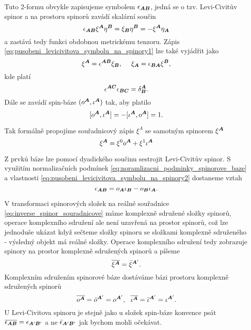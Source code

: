 Tuto 2-formu obvykle zapisujeme symbolem $\epsilon_{{\boldsymbol{A}} {\boldsymbol{B}}}$, jedná se o tzv. Levi-Civitův spinor a na prostoru
spinorů zavádí skalární součin
\begin{equation}
    \label{eq:pusobeni_levicivitova_symbolu_na_spinory1}
    \epsilon_{{\boldsymbol{A}} {\boldsymbol{B}}} \xi^{\boldsymbol{A}} \eta^{\boldsymbol{B}} = \xi_{\boldsymbol{B}} \eta^{\boldsymbol{B}} = -\xi^{\boldsymbol{A}}\eta_{\boldsymbol{A}}
\end{equation}
a zastává tedy funkci obdobnou metrickému tenzoru. Zápis \ref{eq:pusobeni_levicivitova_symbolu_na_spinory1} lze
také vyjádřit jako
\begin{equation}
    \label{eq:pusobeni_levicivitova_symbolu_na_spinory2}
    \xi^{\boldsymbol{A}} = \epsilon^{{\boldsymbol{A}}{\boldsymbol{B}}} \xi_{\boldsymbol{B}}, ~~~~ \xi_{\boldsymbol{A}} = \epsilon_{{\boldsymbol{B}}{\boldsymbol{A}}} \xi^{\boldsymbol{B}},
\end{equation}
kde platí
\begin{equation}
    \epsilon^{{\boldsymbol{A}}{\boldsymbol{C}}} \epsilon_{{\boldsymbol{B}}{\boldsymbol{C}}} = \delta_{\boldsymbol{B}}^{\boldsymbol{A}}.
\end{equation}
Dále se zavádí spin-báze $(o^{\boldsymbol{A}}, \iota^{\boldsymbol{A}})$ tak, aby platilo
\begin{equation}
    \label{eq:noramlizacni_podminky_spinorove_baze}
    [o^{\boldsymbol{A}}, \iota^{\boldsymbol{A}}] = -[\iota^{\boldsymbol{A}}, o^{\boldsymbol{A}}] = 1.
\end{equation}

Tak formálně propojíme souřadnicový zápis $\xi^A$ se samotným spinorem $\xi^{\boldsymbol{A}}$
\begin{equation}
    \xi^{\boldsymbol{A}} = \xi^0 o^{\boldsymbol{A}} + \xi^1 \iota^{\boldsymbol{A}}
\end{equation}

Z prvků báze lze pomocí dyadického součinu sestrojit Levi-Civitův spinor. S využitím normalizačních podmínek
\ref{eq:noramlizacni_podminky_spinorove_baze} a vlastnosti \ref{eq:pusobeni_levicivitova_symbolu_na_spinory2}
dostaneme vztah
\begin{equation}
    \epsilon_{{\boldsymbol{A}}{\boldsymbol{B}}} = o_{\boldsymbol{A}} \iota_{\boldsymbol{B}} - o_{\boldsymbol{B}} \iota_{\boldsymbol{A}}.
\end{equation}

V transformaci spinorových složek na reálné souřadnice \ref{eq:inverse_spinor_souradnicove} máme komplexně
sdružené složky spinorů, operace komplexního sdružení ale není uzavřená na prostor spinorů, což lze jednoduše
ukázat když sečteme složky spinoru se složkami komplexně sdruženého - výsledný objekt má reálné složky.
Operace komplexního sdružení tedy zobrazuje spinory na prostor komplexně sdružených spinorů a píšeme
\begin{equation}
    \overline{\xi^{\boldsymbol{A}}} = \bar{\xi}^{{\boldsymbol{A}}'}.
\end{equation}
Komplexním sdružením spinorové báze dostáváme bázi prostoru komplexně sdružených spinorů
\begin{equation}
    \overline{o^{\boldsymbol{A}}} = \bar{o}^{{\boldsymbol{A}}'} = o^{{\boldsymbol{A}}'}, ~~ \overline{\iota^{{\boldsymbol{A}}}} = \bar{\iota}^{{\boldsymbol{A}}'} = \iota^{{\boldsymbol{A}}'}.
\end{equation}
U Levi-Civitova spinoru je stejně jako u složek spin-báze konvence psát $\overline{\epsilon_{{\boldsymbol{A}}{\boldsymbol{B}}}} = \epsilon_{{\boldsymbol{A}}'{\boldsymbol{B}}'}$ a ne 
$\bar{\epsilon}_{{\boldsymbol{A}}'{\boldsymbol{B}}'}$ jak bychom mohli očekávat.

